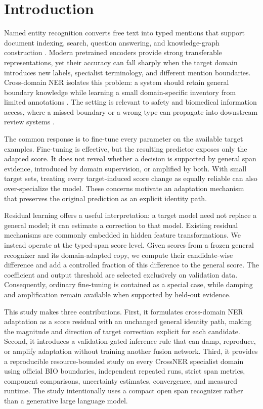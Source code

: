 \documentclass[a4paper,fleqn,numbers,doubleblind]{cas-dc}
\begin{document}
\section{Introduction}
Named entity recognition converts free text into typed mentions that support document indexing, search, question answering, and knowledge-graph construction \citep{li2022ner,hogan2021kg}. Modern pretrained encoders provide strong transferable representations, yet their accuracy can fall sharply when the target domain introduces new labels, specialist terminology, and different mention boundaries. Cross-domain NER isolates this problem: a system should retain general boundary knowledge while learning a small domain-specific inventory from limited annotations \citep{liu2021crossner,conneau2020xlmr,han2023spanbased}. The setting is relevant to safety and biomedical information access, where a missed boundary or a wrong type can propagate into downstream review systems \citep{gurulingappa2012ade}.

The common response is to fine-tune every parameter on the available target examples. Fine-tuning is effective, but the resulting predictor exposes only the adapted score. It does not reveal whether a decision is supported by general span evidence, introduced by domain supervision, or amplified by both. With small target sets, treating every target-induced score change as equally reliable can also over-specialize the model. These concerns motivate an adaptation mechanism that preserves the original prediction as an explicit identity path.

Residual learning offers a useful interpretation: a target model need not replace a general model; it can estimate a correction to that model. Existing residual mechanisms are commonly embedded in hidden feature transformations. We instead operate at the typed-span score level. Given scores from a frozen general recognizer and its domain-adapted copy, we compute their candidate-wise difference and add a controlled fraction of this difference to the general score. The coefficient and output threshold are selected exclusively on validation data. Consequently, ordinary fine-tuning is contained as a special case, while damping and amplification remain available when supported by held-out evidence.

This study makes three contributions. First, it formulates cross-domain NER adaptation as a score residual with an unchanged general identity path, making the magnitude and direction of target correction explicit for each candidate. Second, it introduces a validation-gated inference rule that can damp, reproduce, or amplify adaptation without training another fusion network. Third, it provides a reproducible resource-bounded study on every CrossNER specialist domain using official BIO boundaries, independent repeated runs, strict span metrics, component comparisons, uncertainty estimates, convergence, and measured runtime. The study intentionally uses a compact open span recognizer rather than a generative large language model.
\end{document}
